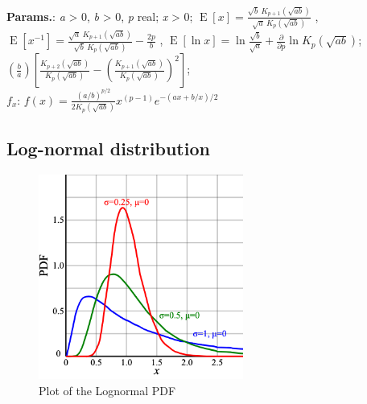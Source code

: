     {\color{darkblue} \textbf{Params.}:} {\textit{a} > 0, \textit{b} > 0, \textit{p} real}; {\textit{x} > 0}; {$\operatorname{E}[x]=\frac{\sqrt{b}\ K_{p+1}(\sqrt{a b}) }{ \sqrt{a}\ K_{p}(\sqrt{a b})}$ ,  $\operatorname{E}[x^{-1}]=\frac{\sqrt{a}\ K_{p+1}(\sqrt{a b}) }{ \sqrt{b}\ K_{p}(\sqrt{a b})}-\frac{2p}{b}$ ,  $\operatorname{E}[\ln x]=\ln \frac{\sqrt{b}}{\sqrt{a}}+\frac{\partial}{\partial p} \ln K_{p}(\sqrt{a b})$}; {$\left(\frac{b}{a}\right)\left[\frac{K_{p+2}(\sqrt{ab})}{K_p(\sqrt{ab})}-\left(\frac{K_{p+1}(\sqrt{ab})}{K_p(\sqrt{ab})}\right)^2\right]$};\hspace{0.5cm}\\{\color{darkblue} \textbf{$f_x$}:} {$f(x) = \frac{(a/b)^{p/2}}{2 K_p(\sqrt{ab})} x^{(p-1)} e^{-(ax + b/x)/2}$}



    
        
\subsection{Log-normal distribution}


    \begin{figure}[H]
        \centering
        \includegraphics[width=0.6\textwidth]{images/PDF-log normal distributions.png}
        \caption{Plot of the Lognormal PDF}
    \end{figure}




